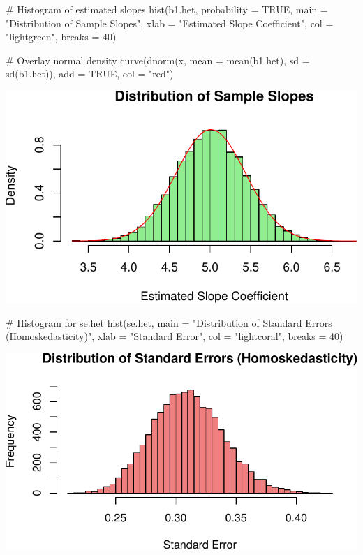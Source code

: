 \documentclass[
  11pt,
]{article}
\newenvironment{Shaded}{\begin{snugshade}}{\end{snugshade}}
\newcommand{\AttributeTok}[1]{\textcolor[rgb]{0.40,0.45,0.13}{#1}}
\newcommand{\CommentTok}[1]{\textcolor[rgb]{0.37,0.37,0.37}{#1}}
\newcommand{\ConstantTok}[1]{\textcolor[rgb]{0.56,0.35,0.01}{#1}}
\newcommand{\DecValTok}[1]{\textcolor[rgb]{0.68,0.00,0.00}{#1}}
\newcommand{\FunctionTok}[1]{\textcolor[rgb]{0.28,0.35,0.67}{#1}}
\newcommand{\NormalTok}[1]{\textcolor[rgb]{0.00,0.23,0.31}{#1}}
\newcommand{\StringTok}[1]{\textcolor[rgb]{0.13,0.47,0.30}{#1}}
\begin{document}
\begin{Shaded}
\begin{Highlighting}[]
\CommentTok{\# Histogram of estimated slopes}
\FunctionTok{hist}\NormalTok{(b1.het, }\AttributeTok{probability =} \ConstantTok{TRUE}\NormalTok{, }\AttributeTok{main =} \StringTok{"Distribution of Sample Slopes"}\NormalTok{, }\AttributeTok{xlab =} \StringTok{"Estimated Slope Coefficient"}\NormalTok{, }\AttributeTok{col =} \StringTok{"lightgreen"}\NormalTok{, }\AttributeTok{breaks =} \DecValTok{40}\NormalTok{)}

\CommentTok{\# Overlay normal density}
\FunctionTok{curve}\NormalTok{(}\FunctionTok{dnorm}\NormalTok{(x, }\AttributeTok{mean =} \FunctionTok{mean}\NormalTok{(b1.het), }\AttributeTok{sd =} \FunctionTok{sd}\NormalTok{(b1.het)), }\AttributeTok{add =} \ConstantTok{TRUE}\NormalTok{, }\AttributeTok{col =} \StringTok{"red"}\NormalTok{)}
\end{Highlighting}
\end{Shaded}

\includegraphics{HW-4-CODE-and-ANSWERS_files/figure-pdf/unnamed-chunk-17-3.pdf}

\begin{Shaded}
\begin{Highlighting}[]
\CommentTok{\# Histogram for se.het}
\FunctionTok{hist}\NormalTok{(se.het, }\AttributeTok{main =} \StringTok{"Distribution of Standard Errors (Homoskedasticity)"}\NormalTok{, }\AttributeTok{xlab =} \StringTok{"Standard Error"}\NormalTok{, }\AttributeTok{col =} \StringTok{"lightcoral"}\NormalTok{, }\AttributeTok{breaks =} \DecValTok{40}\NormalTok{)}
\end{Highlighting}
\end{Shaded}

\includegraphics{HW-4-CODE-and-ANSWERS_files/figure-pdf/unnamed-chunk-17-4.pdf}
\end{document}
